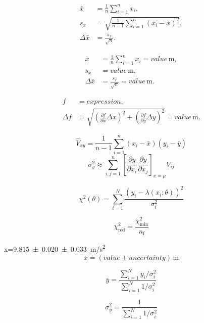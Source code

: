 \documentclass[a4paper, 12pt]{article}
\begin{document}
{

\begin{align}
    \bar{x} &= \frac{1}{n} \sum_{i=1}^{n} x_{i}, \\
    s_{x} &= \sqrt{\frac{1}{n-1} \sum_{i=1}^{n} \left(x_{i} - \bar{x}\right)^2}, \\
    \Delta \bar{x} &= \frac{s_{x}}{\sqrt{n}}.
    \label{eq:uncertainty_workflow}
\end{align}


\begin{align}
    \bar{x} &= \frac{1}{n} \sum_{i=1}^{n} x_{i} = value\,\si{\meter}, \\
    s_{x} &= value\,\si{\meter}, \\
    \Delta \bar{x} &= \frac{s_{x}}{\sqrt{n}} = value\,\si{\meter}.
    \label{eq:rep_result}
\end{align}

\begin{align}
    f &= expression, \\
    \Delta f &= \sqrt{\left(\frac{\partial f}{\partial x} \Delta x\right)^2 + \left(\frac{\partial f}{\partial y} \Delta y\right)^2} = value\,\si{\meter}.
    \label{eq:derived_propagation}
\end{align}

\begin{equation}
    \hat{V}_{xy} = \frac{1}{n-1} \sum_{i=1}^{n} \left(x_{i} - \bar{x}\right)\left(y_{i} - \bar{y}\right)
    \label{eq:empirical_covariance}
\end{equation}
\begin{equation}
    \sigma_{y}^2 \approx \sum_{i,j=1}^{n} \left[\frac{\partial y}{\partial x_{i}}\frac{\partial y}{\partial x_{j}}\right]_{x=\mu} V_{ij}
    \label{eq:error_propagation_cov}
\end{equation}  

\begin{equation}
    \chi^2(\theta) = \sum_{i=1}^{N} \frac{\left(y_{i} - \lambda(x_{i}; \theta)\right)^2}{\sigma_{i}^2}
    \label{eq:chi2}
\end{equation}

\begin{equation}
    \chi^2_{\mathrm{red}} = \frac{\chi^2_{\min}}{n_\mathrm{f}}
    \label{eq:reduced_chi2}
\end{equation}

x=\qty[uncertainty-descriptors={stat.,sys.}]{9.815+-0.020+-0.033}{m/s^2}
\begin{equation}
    x = (value \pm uncertainty)\,\si{\meter}
    \label{eq:result}
\end{equation}

}

\begin{equation}
    \bar{y} = \frac{\sum_{i=1}^{N} y_{i}/\sigma_{i}^2}{\sum_{i=1}^{N} 1/\sigma_{i}^2}
    \label{eq:weighted_mean}
\end{equation}

\begin{equation}
    \sigma_{\bar{y}}^2 = \frac{1}{\sum_{i=1}^{N} 1/\sigma_{i}^2}
    \label{eq:weighted_mean_variance}
\end{equation}
\end{document}
